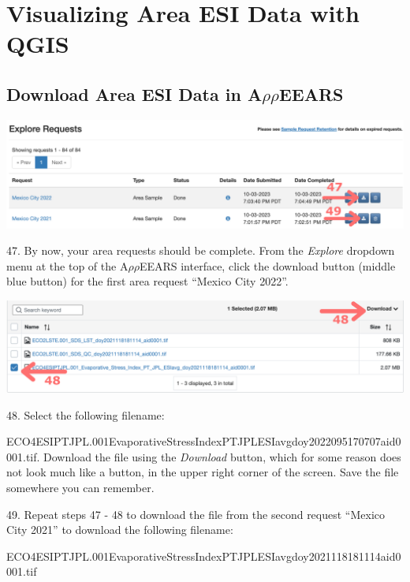 \documentclass[oneside,a4paper,11pt,explicit]{book}
\begin{document}
\section{Visualizing Area ESI Data with QGIS}

\subsection{Download Area ESI Data in A$\rho\rho$EEARS}

\centerline{\includegraphics[width=.6\textwidth]{ESIareaRequestDown.png}}

\vspace{.5em}

47. By now, your area requests should be complete. From the \textit{Explore} dropdown menu at the top of the A$\rho\rho$EEARS interface, click the download button (middle blue button) for the first area request ``Mexico City 2022''. 

\vspace{.5em}

\centerline{\includegraphics[width=.6\textwidth]{ESIareaDownload.png}}

\vspace{.5em}

48. Select the following filename: 

ECO4ESIPTJPL.001\textunderscore Evaporative\textunderscore Stress\textunderscore Index\textunderscore PT\textunderscore JPL\textunderscore ESIavg\textunderscore doy2022095170707\textunderscore aid0001.tif. Download the file using the \textit{Download} button, which for some reason does not look much like a button, in the upper right corner of the screen. Save the file somewhere you can remember. 

49. Repeat steps 47 - 48 to download the file from the second request ``Mexico City 2021'' to download the following filename: 

ECO4ESIPTJPL.001\textunderscore Evaporative\textunderscore Stress\textunderscore Index\textunderscore PT\textunderscore JPL\textunderscore ESIavg\textunderscore doy2021118181114\textunderscore aid0001.tif 
\end{document}
